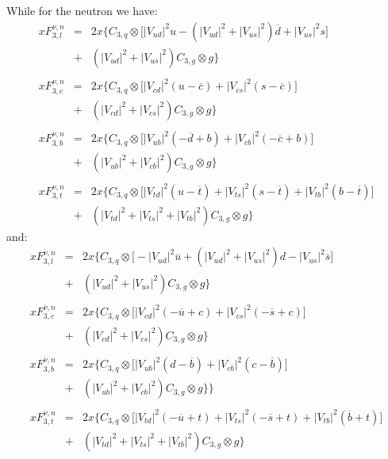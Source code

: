 \documentclass[10pt,a4paper]{article}
\begin{document}
While for the neutron we have:
\begin{equation}
\begin{array}{rcl}  
xF_{3,l}^{\nu,n} &=& 2x\Big\{C_{3,q}\otimes\Big[|V_{ud}|^2 u -\left(|V_{ud}|^2+|V_{us}|^2\right)\overline{d} + |V_{us}|^2 s\Big]\\
                 &+& \left(|V_{ud}|^2+|V_{us}|^2\right)C_{3,g}\otimes g\Big\}\\
\\
xF_{3,c}^{\nu,n} &=& 2x\Big\{C_{3,q}\otimes\Big[|V_{cd}|^2(u-\overline{c}) + |V_{cs}|^2 (s-\overline{c})\Big]\\
                 &+& \left(|V_{cd}|^2+|V_{cs}|^2\right)C_{3,g}\otimes g\Big\}\\
\\
xF_{3,b}^{\nu,n} &=& 2x\Big\{C_{3,q}\otimes\Big[|V_{ub}|^2(-\overline{d}+b) + |V_{cb}|^2 (-\overline{c}+b)\Big]\\
                 &+& \left(|V_{ub}|^2+|V_{cb}|^2\right)C_{3,g}\otimes g\Big\}\\
\\
xF_{3,t}^{\nu,n} &=& 2x\Big\{C_{3,q}\otimes\Big[|V_{td}|^2 (u -\overline{t})+ |V_{ts}|^2(s-\overline{t}) + |V_{tb}|^2(b-\overline{t})\Big]\\
                 &+& \left(|V_{td}|^2 + |V_{ts}|^2 + |V_{tb}|^2\right)C_{3,g}\otimes g\Big\}
\end{array}
\end{equation}
and:
\begin{equation}
\begin{array}{rcl}  
xF_{3,l}^{\overline\nu,n} &=& 2x\Big\{C_{3,q}\otimes\Big[-|V_{ud}|^2 \overline{u} +\left(|V_{ud}|^2+|V_{us}|^2\right)d - |V_{us}|^2 \overline{s}\Big]\\
                 &+& \left(|V_{ud}|^2+|V_{us}|^2\right)C_{3,g}\otimes g\Big\}\\
\\
xF_{3,c}^{\overline\nu,n} &=& 2x\Big\{C_{3,q}\otimes\Big[|V_{cd}|^2(-\overline{u}+c) + |V_{cs}|^2 (-\overline{s}+c)\Big]\\
                 &+& \left(|V_{cd}|^2+|V_{cs}|^2\right)C_{3,g}\otimes g\Big\}\\
\\
xF_{3,b}^{\overline\nu,n} &=& 2x\Big\{C_{3,q}\otimes\Big[|V_{ub}|^2(d-\overline{b}) + |V_{cb}|^2 (c-\overline{b})\Big]\\
                 &+& \left(|V_{ub}|^2+|V_{cb}|^2\right)C_{3,g}\otimes g\Big\}\Big\}\\
\\
xF_{3,t}^{\overline\nu,n} &=& 2x\Big\{C_{3,q}\otimes\Big[|V_{td}|^2 (-\overline{u}+t)+ |V_{ts}|^2(-\overline{s}+t) + |V_{tb}|^2(\overline{b}+t)\Big]\\
                 &+& \left(|V_{td}|^2 + |V_{ts}|^2 + |V_{tb}|^2\right)C_{3,g}\otimes g\Big\}
\end{array}
\end{equation}
\end{document}
